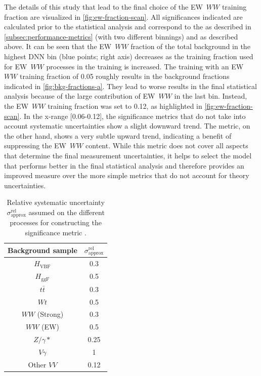 The details of this study that lead to the final choice of the EW~$WW$ training fraction are visualized in \cref{fig:ew-fraction-scan}. All significances indicated are calculated prior to the statistical analysis and correspond to the \ZVBF as described in \cref{subsec:performance-metrics} (with two different binnings) and \ZVBFunc as described above. 
It can be seen that the EW~$WW$ fraction of the total background in the highest DNN bin (blue points; right axis) decreases as the training fraction used for EW~$WW$ processes in the training is increased.
The training with an EW~$WW$ training fraction of 0.05 roughly results in the background fractions indicated in \cref{fig:bkg-fractions-a}. 
They lead to worse results in the final statistical analysis because of the large contribution of EW~$WW$ in the last bin. 
Instead, the EW~$WW$ training fraction was set to 0.12, as highlighted in \cref{fig:ew-fraction-scan}.
In the x-range [0.06-0.12], the significance metrics that do not take into account systematic uncertainties show a slight downward trend. The \ZVBFunc metric, on the other hand, shows a very subtle upward trend, indicating a benefit of suppressing the EW~$WW$ content.
While this metric does not cover all aspects that determine the final measurement uncertainties, it helps to select the model that performs better in the final statistical analysis and therefore provides an improved measure over the more simple metrics that do not account for theory uncertainties.

\begin{table}[h]
    \centering
    \small
    \begin{tabular}{ c  | c}
        \toprule
        Background sample  & $\sigma^\text{rel}_\text{approx}$ \\
        \midrule
        $H_{\mathrm{VBF}}$ & 0.3                               \\
        $H_{\mathrm{ggF}}$ & 0.5                               \\
        $t\bar{t}$         & 0.3                               \\
        $Wt$               & 0.5                               \\
        $WW$ (Strong)      & 0.3                               \\
        $WW$ (EW)          & 0.5                               \\
        $Z/\gamma*$        & 0.25                              \\
        $V\gamma$          & 1                                 \\
        Other $VV$         & 0.12                              \\
        \bottomrule
    \end{tabular}
    \caption[Relative systematic uncertainty assumed on the different processes for constructing the significance metric \ZVBFunc.]{Relative systematic uncertainty $\sigma^\text{rel}_\text{approx}$ assumed on the different processes for constructing the significance metric \ZVBFunc.}
    \label{tab:rough-uncertainties}
\end{table}

